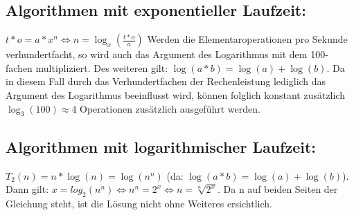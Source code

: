 \documentclass[a4paper,10pt]{article}
\begin{document}
\subsection{Algorithmen mit exponentieller Laufzeit:}
$t*o = a*x^n \Leftrightarrow n = \log_x(\frac{t*o}{a})$ \newline
Werden die Elementaroperationen pro Sekunde verhundertfacht, so wird auch das Argument des Logarithmus mit dem 100-fachen multipliziert.
Des weiteren gilt:\newline
$\log(a*b) = \log(a) + \log(b)$. Da in diesem Fall durch das Verhundertfachen der Rechenleistung lediglich das Argument des 
Logarithmus beeinflusst wird, können folglich konstant zusätzlich $\log_3(100) \approx 4$ Operationen zusätzlich ausgeführt werden.

\subsection{Algorithmen mit logarithmischer Laufzeit:}
$T_2(n) = n*\log(n) = \log(n^n)$ (da: $\log(a*b) = \log(a) + \log(b)$).\newline
Dann gilt: $x = log_2(n^n) \Leftrightarrow n^n = 2^x \Leftrightarrow n = \sqrt[n]{2^x}$. Da n auf beiden Seiten der Gleichung steht,
ist die Lösung nicht ohne Weiteres ersichtlich.
\end{document}
